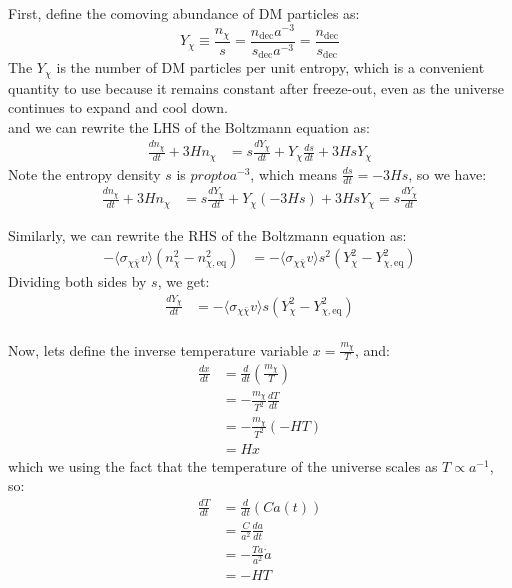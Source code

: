 \begin{foundation}
    First, define the comoving abundance of DM particles as:
    \[
        Y_\chi \equiv \frac{n_\chi}{s}  = \frac{n_\text{dec} a^{-3}}{s_\text{dec} a^{-3}} = \frac{n_\text{dec}}{s_\text{dec}}
    \]
    The $Y_\chi$ is the number of DM particles per unit entropy, which is a convenient quantity to use because it remains constant after freeze-out, even as the universe continues to expand and cool down.\\

    and we can rewrite the LHS of the Boltzmann equation as:
    \begin{align*}
        \frac{dn_\chi}{dt} + 3H n_\chi &= s \frac{dY_\chi}{dt} + Y_\chi \frac{ds}{dt} + 3H s Y_\chi 
    \end{align*}
    Note the entropy density $s$ is $propto a^{-3}$, which means $\frac{ds}{dt} = -3H s$, so we have:
    \begin{align*}
        \frac{dn_\chi}{dt} + 3H n_\chi &= s \frac{dY_\chi}{dt} + Y_\chi (-3H s) + 3H s Y_\chi 
        = s \frac{dY_\chi}{dt} 
    \end{align*}

    Similarly, we can rewrite the RHS of the Boltzmann equation as:
    \begin{align*}
        - \langle \sigma_{\chi \bar{\chi}} v \rangle (n_\chi^2 - n_{\chi,\mathrm{eq}}^2) &= - \langle \sigma_{\chi \bar{\chi}} v \rangle s^2 (Y_\chi^2 - Y_{\chi,\mathrm{eq}}^2)
    \end{align*}
    Dividing both sides by $s$, we get:
    \begin{align*}
        \frac{dY_\chi}{dt} &= - \langle \sigma_{\chi \bar{\chi}} v \rangle s (Y_\chi^2 - Y_{\chi,\mathrm{eq}}^2) \\
    \end{align*}

    Now, lets define the inverse temperature variable $x = \frac{m_\chi}{T}$, and:
    \begin{align*}
        \frac{dx}{dt} &= \frac{d}{dt} \left( \frac{m_\chi}{T} \right) \\
        &= - \frac{m_\chi}{T^2} \frac{dT}{dt} \\
        &= - \frac{m_\chi}{T^2} (-H T) \\
        &= H x
    \end{align*}
    which we using the fact that the temperature of the universe scales as $T \propto a^{-1}$, so:
    \begin{align*}
        \frac{dT}{dt} &= \frac{d}{dt}(C a(t)) \\
        & = \frac{C}{a^2} \frac{da}{dt} \\
        & = - \frac{T a}{a^2} \dot{a} \\
        & = - H T
    \end{align*}


\end{foundation}
